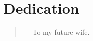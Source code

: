 \chapter*{Dedication}

{
  \raggedleft\large{}
  \begin{quote}
  \hfill--- To my future wife.
  \end{quote}
}
